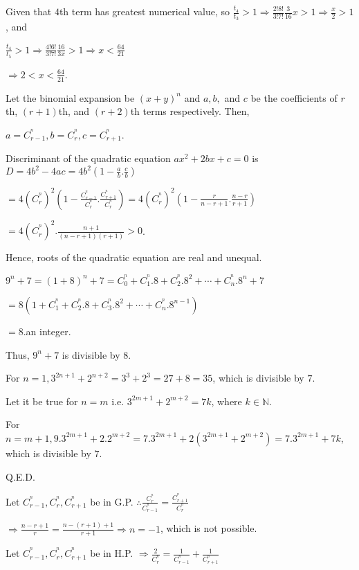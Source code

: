   Given that $4$th term has greatest numerical value, so $\frac{t_4}{t_3} > 1 \Rightarrow
  \frac{2!8!}{3!7!}\frac{3}{16}x > 1 \Rightarrow \frac{x}{2} > 1$, and

  $\frac{t_4}{t_5} > 1 \Rightarrow \frac{4!6!}{3!7!}\frac{16}{3x} > 1 \Rightarrow x < \frac{64}{21}$

  $\Rightarrow 2 < x < \frac{64}{21}$.
\item Let the binomial expansion be $(x + y)^n$ and $a, b,$ and $c$ be the coefficients of $r$th, $(r +
  1)$th, and $(r + 2)$th terms respectively. Then,

  $a = C_{r - 1}^^n, b = C_r^^n, c = C_{r + 1}^^n$.

  Discriminant of the quadratic equation $ax^2 + 2bx + c = 0$ is $D = 4b^2 - 4ac = 4b^2\left(1 -
  \frac{a}{b}.\frac{c}{b}\right)$

  $= 4(C_r^^n)^2\left(1 - \frac{C_{r - 1}^^n}{C_r^^n}.\frac{C_{r + 1}^^n}{C_r^^n}\right) =
  4(C_r^^n)^2\left(1 - \frac{r}{n - r + 1}.\frac{n - r}{r + 1}\right)$

  $= 4(C_r^^n)^2.\frac{n + 1}{(n - r + 1)(r + 1)} > 0$.

  Hence, roots of the quadratic equation are real and unequal.
\item $9^n + 7 = (1 + 8)^n + 7 = C_0^^n + C_1^^n.8 + C_2^^n.8^2 + \cdots + C_n^^n.8^n + 7$

  $= 8\left(1 + C_1^^n + C_2^^n.8 + C_3^^n.8^2 + \cdots + C_n^^n.8^{n - 1}\right)$

  $= 8.$an integer.

  Thus, $9^n + 7$ is divisible by $8$.
\item For $n = 1, 3^{2n+ 1} + 2^{n + 2} = 3^3 + 2^3 = 27 + 8 = 35$, which is divisible by $7$.

  Let it be true for $n = m$ i.e. $3^{2m + 1} + 2^{m + 2} = 7k$, where $k\in\mathbb{N}$.

  For $n = m + 1, 9.3^{2m + 1} + 2.2^{m + 2} = 7.3^{2m + 1} + 2(3^{2m + 1} + 2^{m + 2}) = 7.3^{2m + 1} +
  7k$, which is divisible by $7$.

  Q.E.D.
\item Let $C_{r - 1}^^n, C_r^^n, C_{r + 1}^^n$ be in G.P. $\therefore \frac{C_r^^n}{C_{r - 1}^^n} =
  \frac{C_{r + 1}^^n}{C_r^^n}$

  $\Rightarrow \frac{n - r + 1}{r} = \frac{n - (r + 1) + 1}{r + 1} \Rightarrow n = -1$, which is not
  possible.

  Let $C_{r - 1}^^n, C_r^^n, C_{r + 1}^^n$ be in H.P. $\Rightarrow \frac{2}{C_r^^n} = \frac{1}{C_{r - 1}^^n}
  + \frac{1}{C_{r + 1}^^n}$

